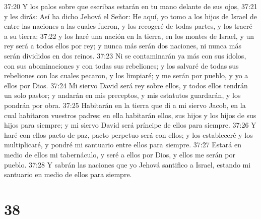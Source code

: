 37:20 Y los palos sobre que escribas estarán en tu mano delante de sus ojos,  
37:21 y les dirás: Así ha dicho Jehová el Señor: He aquí, yo tomo a los hijos de Israel de entre las naciones a las cuales fueron, y los recogeré de todas partes, y los traeré a su tierra;  
37:22 y los haré una nación en la tierra, en los montes de Israel, y un rey será a todos ellos por rey; y nunca más serán dos naciones, ni nunca más serán divididos en dos reinos.  
37:23 Ni se contaminarán ya más con sus ídolos, con sus abominaciones y con todas sus rebeliones; y los salvaré de todas sus rebeliones con las cuales pecaron, y los limpiaré; y me serán por pueblo, y yo a ellos por Dios.  
37:24 Mi siervo David será rey sobre ellos, y todos ellos tendrán un solo pastor; y andarán en mis preceptos, y mis estatutos guardarán, y los pondrán por obra.  
37:25 Habitarán en la tierra que di a mi siervo Jacob, en la cual habitaron vuestros padres; en ella habitarán ellos, sus hijos y los hijos de sus hijos para siempre; y mi siervo David será príncipe de ellos para siempre.  
37:26 Y haré con ellos pacto de paz, pacto perpetuo será con ellos; y los estableceré y los multiplicaré, y pondré mi santuario entre ellos para siempre.  
37:27 Estará en medio de ellos mi tabernáculo, y seré a ellos por Dios, y ellos me serán por pueblo. 
37:28 Y sabrán las naciones que yo Jehová santifico a Israel, estando mi santuario en medio de ellos para siempre.  

\chapter{38}

